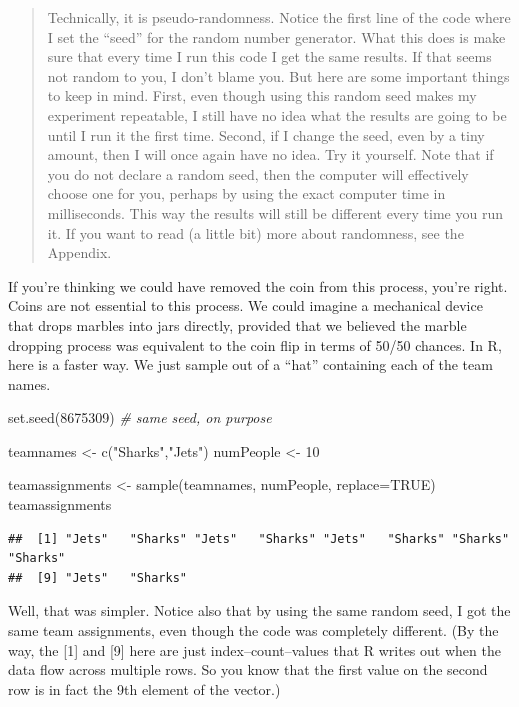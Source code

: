\documentclass[
  openany]{book}
\newenvironment{Shaded}{\begin{snugshade}}{\end{snugshade}}
\newcommand{\AttributeTok}[1]{\textcolor[rgb]{0.77,0.63,0.00}{#1}}
\newcommand{\CommentTok}[1]{\textcolor[rgb]{0.56,0.35,0.01}{\textit{#1}}}
\newcommand{\ConstantTok}[1]{\textcolor[rgb]{0.00,0.00,0.00}{#1}}
\newcommand{\DecValTok}[1]{\textcolor[rgb]{0.00,0.00,0.81}{#1}}
\newcommand{\FunctionTok}[1]{\textcolor[rgb]{0.00,0.00,0.00}{#1}}
\newcommand{\NormalTok}[1]{#1}
\newcommand{\OtherTok}[1]{\textcolor[rgb]{0.56,0.35,0.01}{#1}}
\newcommand{\StringTok}[1]{\textcolor[rgb]{0.31,0.60,0.02}{#1}}
\begin{document}
\begin{quote}
Technically, it is pseudo-randomness. Notice the first line of the code where I set the ``seed'' for the random number generator. What this does is make sure that every time I run this code I get the same results. If that seems not random to you, I don't blame you. But here are some important things to keep in mind. First, even though using this random seed makes my experiment repeatable, I still have no idea what the results are going to be until I run it the first time. Second, if I change the seed, even by a tiny amount, then I will once again have no idea. Try it yourself. Note that if you do not declare a random seed, then the computer will effectively choose one for you, perhaps by using the exact computer time in milliseconds. This way the results will still be different every time you run it. If you want to read (a little bit) more about randomness, see the Appendix.
\end{quote}

If you're thinking we could have removed the coin from this process, you're right. Coins are not essential to this process. We could imagine a mechanical device that drops marbles into jars directly, provided that we believed the marble dropping process was equivalent to the coin flip in terms of 50/50 chances. In R, here is a faster way. We just sample out of a ``hat'' containing each of the team names.

\begin{Shaded}
\begin{Highlighting}[]
\FunctionTok{set.seed}\NormalTok{(}\DecValTok{8675309}\NormalTok{) }\CommentTok{\# same seed, on purpose}

\NormalTok{teamnames }\OtherTok{\textless{}{-}} \FunctionTok{c}\NormalTok{(}\StringTok{"Sharks"}\NormalTok{,}\StringTok{"Jets"}\NormalTok{)}
\NormalTok{numPeople }\OtherTok{\textless{}{-}} \DecValTok{10}

\NormalTok{teamassignments }\OtherTok{\textless{}{-}} \FunctionTok{sample}\NormalTok{(teamnames, numPeople, }\AttributeTok{replace=}\ConstantTok{TRUE}\NormalTok{)}
\NormalTok{teamassignments}
\end{Highlighting}
\end{Shaded}

\begin{verbatim}
##  [1] "Jets"   "Sharks" "Jets"   "Sharks" "Jets"   "Sharks" "Sharks" "Sharks"
##  [9] "Jets"   "Sharks"
\end{verbatim}

Well, that was simpler. Notice also that by using the same random seed, I got the same team assignments, even though the code was completely different. (By the way, the {[}1{]} and {[}9{]} here are just index--count--values that R writes out when the data flow across multiple rows. So you know that the first value on the second row is in fact the 9th element of the vector.)
\end{document}

